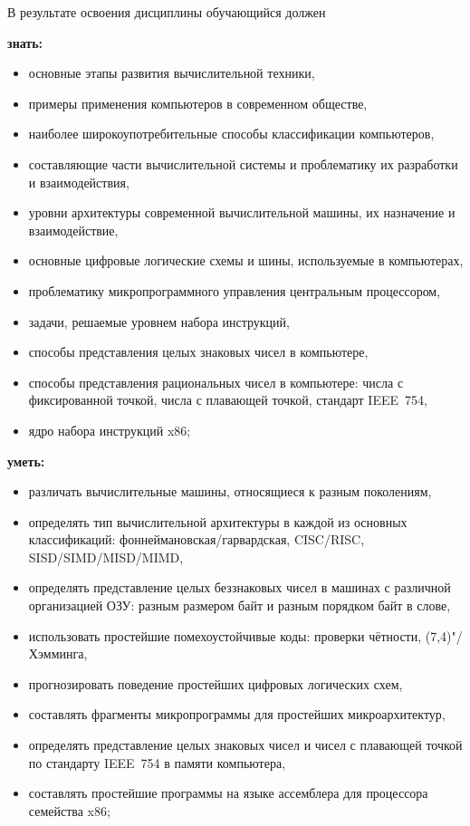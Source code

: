 В результате освоения дисциплины обучающийся должен

\noindent\textbf{знать:}
	\begin{itemize}[topsep=1mm]
		\item основные этапы развития вычислительной техники,
		\item примеры применения компьютеров в современном обществе,
		\item наиболее широкоупотребительные способы классификации компьютеров,
		\item составляющие части вычислительной системы и проблематику их разработки и взаимодействия,
		\item уровни архитектуры современной вычислительной машины, их назначение и взаимодействие,
		\item основные цифровые логические схемы и шины, используемые в компьютерах,
		\item проблематику микропрограммного управления центральным процессором,
		\item задачи, решаемые уровнем набора инструкций,
		\item способы представления целых знаковых чисел в компьютере,
		\item способы представления рациональных чисел в компьютере: числа с фиксированной точкой, числа с плавающей точкой, стандарт IEEE~754,
		\item ядро набора инструкций x86;
	\end{itemize}

\noindent\textbf{уметь:}
	\begin{itemize}[topsep=1mm]
		\item различать вычислительные машины, относящиеся к разным поколениям,
		\item определять тип вычислительной архитектуры в каждой из основных классификаций: фоннеймановская/гарвардская, CISC/RISC, SISD/SIMD/MISD/MIMD,
		\item определять представление целых беззнаковых чисел в машинах с различной организацией ОЗУ: разным размером байт и разным порядком байт в слове,
		\item использовать простейшие помехоустойчивые коды: проверки чётности, (7,4)"/Хэм\-мин\-га,
		\item прогнозировать поведение простейших цифровых логических схем,
		\item составлять фрагменты микропрограммы для простейших микроархитектур,
		\item определять представление целых знаковых чисел и чисел с плавающей точкой по стандарту IEEE~754 в памяти компьютера,
		\item составлять простейшие программы на языке ассемблера для процессора семейства x86;
	\end{itemize}

